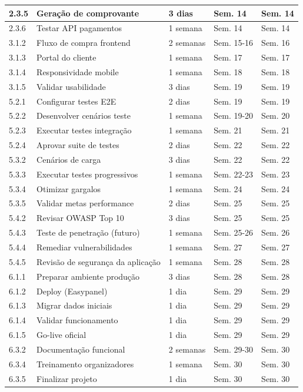 \begin{table}[H]
\begin{tabular}{|p{1cm}|p{6cm}|p{2cm}|p{2cm}|p{2cm}|}
2.3.5 & Geração de comprovante & 3 dias & Sem. 14 & Sem. 14 \\ \hline
2.3.6 & Testar API pagamentos & 1 semana & Sem. 14 & Sem. 14 \\ \hline
3.1.2 & Fluxo de compra frontend & 2 semanas & Sem. 15-16 & Sem. 16 \\ \hline
3.1.3 & Portal do cliente & 1 semana & Sem. 17 & Sem. 17 \\ \hline
3.1.4 & Responsividade mobile & 1 semana & Sem. 18 & Sem. 18 \\ \hline
3.1.5 & Validar usabilidade & 3 dias & Sem. 19 & Sem. 19 \\ \hline
5.2.1 & Configurar testes E2E & 2 dias & Sem. 19 & Sem. 19 \\ \hline
5.2.2 & Desenvolver cenários teste & 1 semana & Sem. 19-20 & Sem. 20 \\ \hline
5.2.3 & Executar testes integração & 1 semana & Sem. 21 & Sem. 21 \\ \hline
5.2.4 & Aprovar suite de testes & 2 dias & Sem. 22 & Sem. 22 \\ \hline
5.3.2 & Cenários de carga & 3 dias & Sem. 22 & Sem. 22 \\ \hline
5.3.3 & Executar testes progressivos & 1 semana & Sem. 22-23 & Sem. 23 \\ \hline
5.3.4 & Otimizar gargalos & 1 semana & Sem. 24 & Sem. 24 \\ \hline
5.3.5 & Validar metas performance & 2 dias & Sem. 25 & Sem. 25 \\ \hline
5.4.2 & Revisar OWASP Top 10 & 3 dias & Sem. 25 & Sem. 25 \\ \hline
5.4.3 & Teste de penetração (futuro) & 1 semana & Sem. 25-26 & Sem. 26 \\ \hline
5.4.4 & Remediar vulnerabilidades & 1 semana & Sem. 27 & Sem. 27 \\ \hline
5.4.5 & Revisão de segurança da aplicação & 1 semana & Sem. 28 & Sem. 28 \\ \hline
6.1.1 & Preparar ambiente produção & 3 dias & Sem. 28 & Sem. 28 \\ \hline
6.1.2 & Deploy (Easypanel) & 1 dia & Sem. 29 & Sem. 29 \\ \hline
6.1.3 & Migrar dados iniciais & 1 dia & Sem. 29 & Sem. 29 \\ \hline
6.1.4 & Validar funcionamento & 1 dia & Sem. 29 & Sem. 29 \\ \hline
6.1.5 & Go-live oficial & 1 dia & Sem. 29 & Sem. 29 \\ \hline
6.3.2 & Documentação funcional & 2 semanas & Sem. 29-30 & Sem. 30 \\ \hline
6.3.4 & Treinamento organizadores & 1 semana & Sem. 30 & Sem. 30 \\ \hline
6.3.5 & Finalizar projeto & 1 dia & Sem. 30 & Sem. 30 \\ \hline
\end{tabular}
\end{table}

